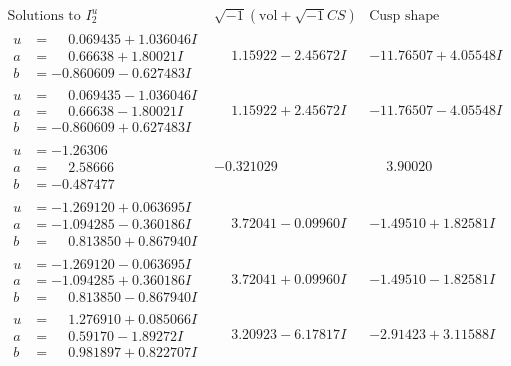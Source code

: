 \documentclass[1p]{elsarticle_modified}
\theoremstyle{definition}
\newcommand{\I}{\sqrt{-1}}
\begin{document}
$$\begin{array}{c|c|c}  
\text{Solutions to }I^u_{2}& \I (\text{vol} + \sqrt{-1}CS) & \text{Cusp shape}\\
 \hline 
\begin{aligned}
u &= \phantom{-}0.069435 + 1.036046 I \\
a &= \phantom{-}0.66638 + 1.80021 I \\
b &= -0.860609 - 0.627483 I\end{aligned}
 & \phantom{-}1.15922 - 2.45672 I & -11.76507 + 4.05548 I \\ \hline\begin{aligned}
u &= \phantom{-}0.069435 - 1.036046 I \\
a &= \phantom{-}0.66638 - 1.80021 I \\
b &= -0.860609 + 0.627483 I\end{aligned}
 & \phantom{-}1.15922 + 2.45672 I & -11.76507 - 4.05548 I \\ \hline\begin{aligned}
u &= -1.26306\phantom{ +0.000000I} \\
a &= \phantom{-}2.58666\phantom{ +0.000000I} \\
b &= -0.487477\phantom{ +0.000000I}\end{aligned}
 & -0.321029\phantom{ +0.000000I} & \phantom{-}3.90020\phantom{ +0.000000I} \\ \hline\begin{aligned}
u &= -1.269120 + 0.063695 I \\
a &= -1.094285 - 0.360186 I \\
b &= \phantom{-}0.813850 + 0.867940 I\end{aligned}
 & \phantom{-}3.72041 - 0.09960 I & -1.49510 + 1.82581 I \\ \hline\begin{aligned}
u &= -1.269120 - 0.063695 I \\
a &= -1.094285 + 0.360186 I \\
b &= \phantom{-}0.813850 - 0.867940 I\end{aligned}
 & \phantom{-}3.72041 + 0.09960 I & -1.49510 - 1.82581 I \\ \hline\begin{aligned}
u &= \phantom{-}1.276910 + 0.085066 I \\
a &= \phantom{-}0.59170 - 1.89272 I \\
b &= \phantom{-}0.981897 + 0.822707 I\end{aligned}
 & \phantom{-}3.20923 - 6.17817 I & -2.91423 + 3.11588 I \\ \hline\begin{aligned}

\end{aligned}
\end{array}$$
\end{document}

